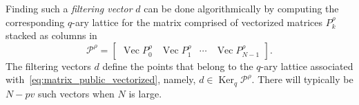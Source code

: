 \documentclass[journal, twoside, web]{ieeecolorpreprint}
\DeclareMathOperator{\Ker}{Ker}
\DeclareMathOperator{\vecc}{Vec}
\begin{document}
Finding such a \emph{filtering vector} $d$ can be done algorithmically by computing the corresponding $q$-ary lattice for the matrix comprised of vectorized matrices $P_k^\rho$ stacked as columns in
\begin{equation} \label{eq:matrix_public_vectorized}
    \mathcal{P}^\rho= \begin{bmatrix}
        \vecc P_0^\rho & \vecc P_1^\rho &\cdots & \vecc P_{N-1}^\rho \end{bmatrix}.%
\end{equation}
The filtering vectors $d$ define the points that belong to the $q$-ary lattice associated with~\eqref{eq:matrix_public_vectorized}, namely, $d \in \Ker_q {\mathcal{P}^\rho}$. 
There will typically be $N-pv$ such vectors when $N$ is large. %


\end{document}
